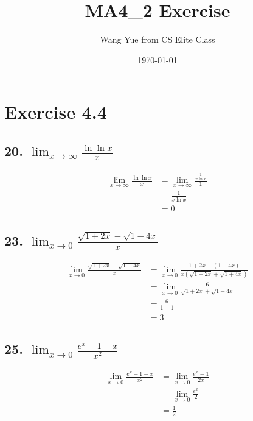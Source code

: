 \documentclass{article}
\begin{document}
    \title{MA4\_2 Exercise}
    \author{Wang Yue from CS Elite Class}
    \date{\today}

    \maketitle

    \section*{Exercise 4.4}

    
    \subsection*{20. $\lim_{x \to \infty}\frac{\ln \ln x}{x}$}

    $$\begin{aligned}
        \lim_{x \to \infty}\frac{\ln \ln x}{x} &= \lim_{x \to \infty}\frac{\frac{1}{x\ln x}}{1} \\
        &= \frac{1}{x \ln x} \\
        &= 0
    \end{aligned}$$

    \subsection*{23. $\lim_{x \to 0}\frac{\sqrt{1 + 2x} - \sqrt{1 - 4x}}{x}$}

    $$\begin{aligned}
        \lim_{x \to 0}\frac{\sqrt{1 + 2x} - \sqrt{1 - 4x}}{x} &= \lim_{x \to 0}\frac{1 + 2x - (1 - 4x)}{x(\sqrt{1 + 2x} + \sqrt{1 + 4x})} \\
        &= \lim_{x\to 0} \frac{6}{\sqrt{1 + 2x} + \sqrt{1 - 4x}} \\
        &= \frac{6}{1 + 1} \\
        &= 3
    \end{aligned}$$

    \subsection*{25. $\lim_{x \to 0}\frac{e^x - 1 - x}{x^2}$}

    $$\begin{aligned}
        \lim_{x \to 0}\frac{e^x - 1 - x}{x^2} &= \lim_{x \to 0}\frac{e^x - 1}{2x} \\
        &= \lim_{x \to 0}\frac{e^x}{2} \\
        &= \frac 1 2
    \end{aligned}$$
\end{document}

